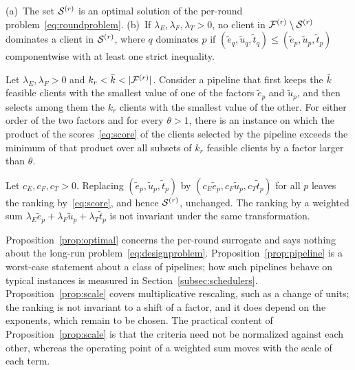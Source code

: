 \begin{proposition}
	\label{prop:optimal}
	(a)~The set $\mathcal{S}^{(r)}$ is an optimal solution of the per-round problem~\eqref{eq:roundproblem}. (b)~If $\lambda_E,\lambda_F,\lambda_T>0$, no client in $\mathcal{F}^{(r)}\setminus\mathcal{S}^{(r)}$ dominates a client in $\mathcal{S}^{(r)}$, where $q$ dominates $p$ if $(\tilde e_q,\tilde u_q,\tilde t_q)\le(\tilde e_p,\tilde u_p,\tilde t_p)$ componentwise with at least one strict inequality.
\end{proposition}

\begin{proposition}
	\label{prop:pipeline}
	Let $\lambda_E,\lambda_F>0$ and $k_r<\bar k<|\cF^{(r)}|$. Consider a pipeline that first keeps the $\bar k$ feasible clients with the smallest value of one of the factors $\tilde e_p$ and $\tilde u_p$, and then selects among them the $k_r$ clients with the smallest value of the other. For either order of the two factors and for every $\theta>1$, there is an instance on which the product of the scores~\eqref{eq:score} of the clients selected by the pipeline exceeds the minimum of that product over all subsets of $k_r$ feasible clients by a factor larger than $\theta$.
\end{proposition}

\begin{proposition}
	\label{prop:scale}
	Let $c_E,c_F,c_T>0$. Replacing $(\tilde e_p,\tilde u_p,\tilde t_p)$ by $(c_E\tilde e_p,c_F\tilde u_p,c_T\tilde t_p)$ for all $p$ leaves the ranking by~\eqref{eq:score}, and hence $\mathcal{S}^{(r)}$, unchanged. The ranking by a weighted sum $\lambda_E\tilde e_p+\lambda_F\tilde u_p+\lambda_T\tilde t_p$ is not invariant under the same transformation.
\end{proposition}

\begin{revblock}\begin{remark}
	Proposition~\ref{prop:optimal} concerns the per-round surrogate and says nothing about the long-run problem~\eqref{eq:designproblem}. Proposition~\ref{prop:pipeline} is a worst-case statement about a class of pipelines; how such pipelines behave on typical instances is measured in Section~\ref{subsec:schedulers}. Proposition~\ref{prop:scale} covers multiplicative rescaling, such as a change of units; the ranking is not invariant to a shift of a factor, and it does depend on the exponents, which remain to be chosen. The practical content of Proposition~\ref{prop:scale} is that the criteria need not be normalized against each other, whereas the operating point of a weighted sum moves with the scale of each term.
\end{remark}\end{revblock}

